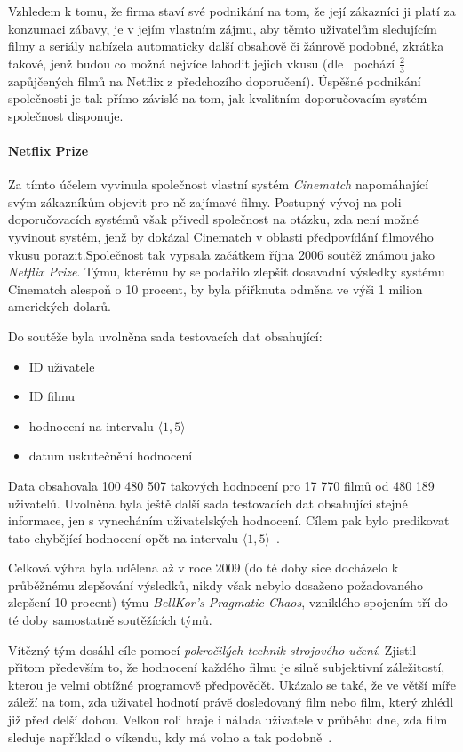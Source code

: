 \documentclass[thesis=M,czech]{FITthesis}[2014/05/07]
\begin{document}
Vzhledem k tomu, že firma staví své podnikání na tom, že její zákazníci ji platí za konzumaci zábavy, je v jejím vlastním zájmu, aby těmto uživatelům sledujícím filmy a seriály nabízela automaticky další obsahově či žánrově podobné, zkrátka takové, jenž budou co možná nejvíce lahodit jejich vkusu (dle~\cite{netflixrec} pochází $\frac{2}{3}$ zapůjčených filmů na Netflix z předchozího doporučení). Úspěšné podnikání společnosti je tak přímo závislé na tom, jak kvalitním doporučovacím systém společnost disponuje. 

\paragraph{Netflix Prize}
Za tímto účelem vyvinula společnost vlastní systém \emph{Cinematch} napomáhající svým zákazníkům objevit pro ně zajímavé filmy. Postupný vývoj na poli doporučovacích systémů však přivedl společnost na otázku, zda není možné vyvinout systém, jenž by dokázal Cinematch v oblasti předpovídání filmového vkusu porazit.Společnost tak vypsala začátkem října 2006 soutěž známou jako \emph{Netflix Prize}. Týmu, kterému by se podařilo zlepšit dosavadní výsledky systému Cinematch alespoň o 10 procent, by byla přiřknuta odměna ve výši 1 milion amerických dolarů.

Do soutěže byla uvolněna sada testovacích dat obsahující:

\begin{itemize}
	\item ID uživatele
	\item ID filmu
	\item hodnocení na intervalu $\langle1,5\rangle$
	\item datum uskutečnění hodnocení
\end{itemize}

Data obsahovala 100 480 507 takových hodnocení pro 17 770 filmů od 480 189 uživatelů. Uvolněna byla ještě další sada testovacích dat obsahující stejné informace, jen s vynecháním uživatelských hodnocení. Cílem pak bylo predikovat tato chybějící hodnocení opět na intervalu $\langle1,5\rangle$~\cite{netflixrules}.

Celková výhra byla udělena až v roce 2009 (do té doby sice docházelo k průběžnému zlepšování výsledků, nikdy však nebylo dosaženo požadovaného zlepšení 10 procent) týmu \emph{BellKor's Pragmatic Chaos}, vzniklého spojením tří do té doby samostatně soutěžících týmů.

Vítězný tým dosáhl cíle pomocí \emph{pokročilých technik strojového učení}. Zjistil přitom především to, že hodnocení každého filmu je silně subjektivní záležitostí, kterou je velmi obtížné programově předpovědět. Ukázalo se také, že ve větší míře záleží na tom, zda uživatel hodnotí právě dosledovaný film nebo film, který zhlédl již před delší dobou. Velkou roli hraje i nálada uživatele v průběhu dne, zda film sleduje například o víkendu, kdy má volno a tak podobně~\cite{bellkor}.
\end{document}
